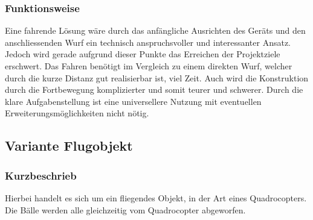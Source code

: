 \subsubsection{Funktionsweise}
Eine fahrende Lösung wäre durch das anfängliche Ausrichten des Geräts und 
den anschliessenden Wurf ein technisch anspruchsvoller und interessanter 
Ansatz. Jedoch wird gerade aufgrund dieser Punkte das Erreichen der 
Projektziele erschwert. Das Fahren benötigt im Vergleich zu einem direkten 
Wurf, welcher durch die kurze Distanz gut realisierbar ist, viel Zeit. Auch 
wird die Konstruktion durch die Fortbewegung komplizierter und somit 
teurer und schwerer. Durch die klare Aufgabenstellung ist eine 
universellere Nutzung mit eventuellen Erweiterungsmöglichkeiten nicht nötig. 



\clearpage

\subsection{Variante Flugobjekt}
\subsubsection{Kurzbeschrieb}
Hierbei handelt es sich um ein fliegendes Objekt, in der Art eines Quadrocopters. Die Bälle werden alle gleichzeitig vom Quadrocopter abgeworfen.

